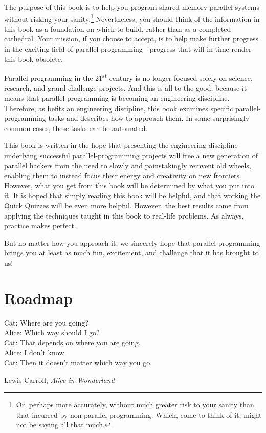 
%

The purpose of this book is to help you program
shared-memory parallel systems without risking your sanity.\footnote{
	Or, perhaps more accurately, without much greater risk to your
	sanity than that incurred by non-parallel programming.
	Which, come to think of it, might not be saying all that much.}
Nevertheless, you should think of the information in this book as a
foundation on which to build, rather than as a completed cathedral.
Your mission, if you choose to accept, is to help make further progress
in the exciting field of parallel programming---progress that will
in time render this book obsolete.

Parallel programming in the 21\textsuperscript{st} century is no longer
focused solely on science, research, and grand-challenge projects.
And this is all to the good, because it means that parallel programming
is becoming an engineering discipline.
Therefore, as befits an engineering discipline, this book examines
specific parallel-programming tasks and describes how to approach them.
In some surprisingly common cases, these tasks can be automated.

This book is written in the hope that presenting the engineering
discipline underlying successful
parallel-programming projects will free a new generation of parallel hackers
from the need to slowly and painstakingly reinvent old wheels, enabling
them to instead focus their energy and creativity on new frontiers.
However, what you get from this book will be determined by what you
put into it.
It is hoped that simply reading this book will be helpful,
and that working the Quick Quizzes will be even more helpful.
However, the best results come from applying the techniques taught
in this book to real-life problems.
As always, practice makes perfect.

But no matter how you approach it, we sincerely hope that parallel
programming brings you at least as much fun, excitement, and challenge
that it has brought to us!

\section{Roadmap}
\label{sec:howto:Roadmap}
%
\epigraph{Cat:
		Where are you going? \\
	  Alice:
		Which way should I go? \\
	  Cat:
		That depends on where you are going. \\
	  Alice:
		I don't know. \\
	  Cat:
		Then it doesn't matter which way you go.}
	 {Lewis Carroll, \emph{Alice in Wonderland}}

